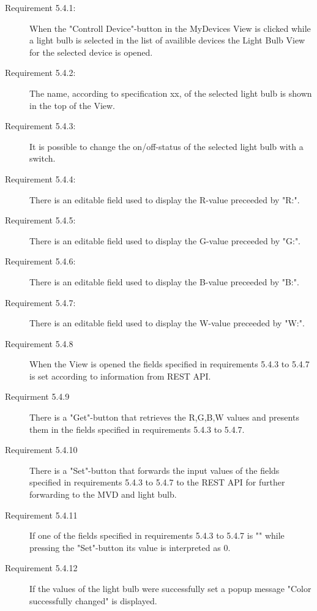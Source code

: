 \documentclass[a4paper]{article}
\begin{document}
\begin{description}
\item[Requirement 5.4.1:] When the "Controll Device"-button in the MyDevices View is clicked while a light bulb is selected in the list of availible devices the Light Bulb View for the selected device is opened. 

\item[Requirement 5.4.2:] The name, according to specification xx, of the selected light bulb is shown in the top of the View.

\item[Requirement 5.4.3:] It is possible to change the on/off-status of the selected light bulb with a switch.

\item[Requirement 5.4.4:] There is an editable field used to display the R-value preceeded by "R:".

\item[Requirement 5.4.5:] There is an editable field used to display the G-value preceeded by "G:".

\item[Requirement 5.4.6:] There is an editable field used to display the B-value preceeded by "B:".

\item[Requirement 5.4.7:] There is an editable field used to display the W-value preceeded by "W:".

\item[Requirement 5.4.8] When the View is opened the fields specified in requirements 5.4.3 to 5.4.7 is set according to information from REST API.

\item[Requirment 5.4.9] There is a "Get"-button that retrieves the R,G,B,W values and presents them in the fields specified in requirements 5.4.3 to 5.4.7.

\item[Requirement 5.4.10] There is a "Set"-button that forwards the input values of the fields specified in requirements 5.4.3 to 5.4.7 to the REST API for further forwarding to the MVD and light bulb.

\item[Requirement 5.4.11] If one of the fields specified in requirements 5.4.3 to 5.4.7 is "" while pressing the "Set"-button its value is interpreted as 0.

\item[Requirement 5.4.12] If the values of the light bulb were successfully set a popup message "Color successfully changed" is displayed.


\end{description}
\end{document}
